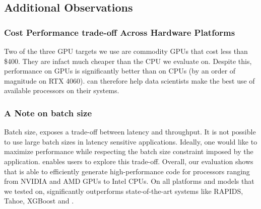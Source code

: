 \subsection{Additional Observations}
\subsubsection*{Cost Performance trade-off Across Hardware Platforms}
Two of the three GPU targets we use are commodity GPUs that cost less than \$400. They 
are infact much cheaper than the CPU we evaluate on. Despite this, performance on GPUs
is significantly better than on CPUs (by an order of magnitude on RTX 4060).
\Treebeard{} can therefore help data scientists make the best use of 
available processors on their systems.

\subsubsection*{A Note on batch size}
Batch size, exposes a trade-off between latency and throughput. It is not possible to use 
large batch sizes in latency sensitive applications. 
Ideally, one would like 
to maximize performance while respecting the batch size constraint imposed 
by the application. \Treebeard{} enables users to explore this trade-off.  
\bigbreak
\noindent
Overall, our evaluation shows that \Treebeard{} is able to efficiently generate 
high-performance code for processors ranging from NVIDIA and AMD GPUs to Intel CPUs.
On all platforms and models that we tested on, \Treebeard{} significantly outperforms
state-of-the-art systems like RAPIDS, Tahoe, XGBoost and \TreebeardOLD{}.
